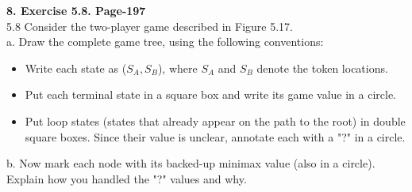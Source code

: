 \documentclass{article}
\begin{document}
\textbf{8. Exercise 5.8. Page-197} \\
5.8 Consider the two-player game described in Figure 5.17. \\
a. Draw the complete game tree, using the following conventions:
\begin{itemize}
  \item Write each state as ($S_A, S_B$), where $S_A$ and $S_B$ denote
    the token locations. 
  \item Put each terminal state in a square box and write its game
    value in a circle. 
  \item Put loop states (states that already appear on the path to the
    root) in double square boxes. Since their value is unclear,
    annotate each with a "?" in a circle. 
\end{itemize}

b. Now mark each node with its backed-up minimax value (also in a
circle). Explain how you handled the "?" values and why. 
\end{document}
